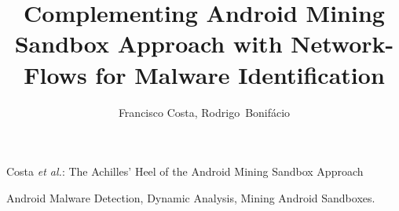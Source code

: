\documentclass[10pt,journal,compsoc]{IEEEtran}
\begin{document}
\title{Complementing Android Mining Sandbox Approach with Network-Flows for Malware Identification}


\author{Francisco Costa,
        Rodrigo~Bonif\'{a}cio
}






%
         {Costa \MakeLowercase{\textit{et al.}}: The Achilles' Heel of the Android Mining Sandbox Approach}


\maketitle


\begin{IEEEkeywords}
Android Malware Detection, Dynamic Analysis, Mining Android Sandboxes.
\end{IEEEkeywords}








\balance 



\end{document}
